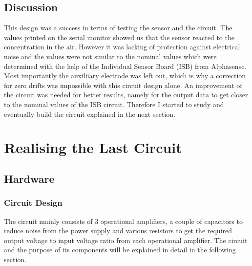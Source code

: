 \subsection{Discussion}
This design was a success in terms of testing the sensor and the circuit. The values printed on the serial monitor showed us that the sensor reacted to the  concentration in the air. However it was lacking of protection against electrical noise and the values were not similar to the nominal values which were determined with the help of the Individual Sensor Board (ISB) from Alphasense. Most importantly the auxiliiary electrode was left out, which is why a correction for zero drifts was impossible with this circuit design alone. An improvement of the circuit was needed for better results, namely for the output data to get closer to the nominal values of the ISB circuit. Therefore I started to study and eventually build the circuit explained in the next section.  


\section{Realising the Last Circuit}
\subsection{Hardware}
\subsubsection{Circuit Design}

The circuit mainly consists of 3 operational amplifiers, a couple of capacitors to reduce noise from the power supply and various resistors to get the required output voltage to input voltage ratio from each operational amplifier. The circuit and the purpose of its components will be explained in detail in the following section. 



